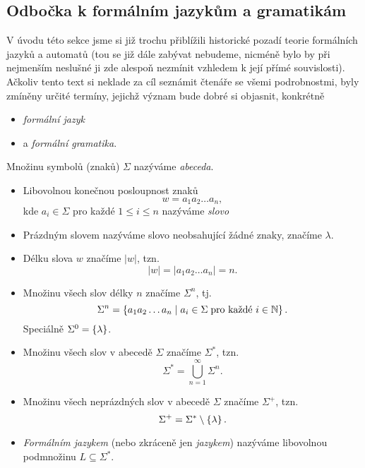 \subsection{Odbočka k formálním jazykům a gramatikám}\label{subsec:formalni-jazyky-a-gramatiky}

V úvodu této sekce jsme si již trochu přiblížili historické pozadí teorie formálních jazyků a automatů (tou se již dále zabývat nebudeme, nicméně bylo by při nejmenším neslušné ji zde alespoň nezmínit vzhledem k její přímé souvislosti). Ačkoliv tento text si neklade za cíl seznámit čtenáře se všemi podrobnostmi, byly zmíněny určité termíny, jejichž význam bude dobré si objasnit, konkrétně
\begin{itemize}
    \item \emph{formální jazyk}
    \item a \emph{formální gramatika}.
\end{itemize}
\begin{definition}\label{def:formalni-jazyk-etc}
    Množinu symbolů (znaků) $\Sigma$ nazýváme \emph{abeceda}.
    \begin{itemize}
        \item Libovolnou konečnou posloupnost znaků
        \[w=a_1a_2\ldots a_n,\]
        kde $a_i\in\Sigma$ pro každé $1\leqslant i\leqslant n$ nazýváme \emph{slovo}
        \item Prázdným slovem nazýváme slovo neobsahující žádné znaky, značíme $\lambda$.
        \item Délku slova $w$ značíme $|w|$, tzn.
        \[|w|=|a_1a_2\ldots a_n|=n.\]
        \item Množinu všech slov délky $n$ značíme $\Sigma^n$, tj.
        \[\Sigma^n=\left\{a_1a_2\ldots a_n\mid a_i\in\Sigma\;\text{pro každé $i\in\mathbb{N}$}\right\}.\]
        Speciálně $\Sigma^0=\left\{\lambda\right\}$.
        \item Množinu všech slov v abecedě $\Sigma$ značíme $\Sigma^*$, tzn.
        \[\Sigma^*=\bigcup_{n=1}^\infty\Sigma^n.\]
        \item Množinu všech neprázdných slov v abecedě $\Sigma$ značíme $\Sigma^+$, tzn.
        \[\Sigma^+=\Sigma^*\setminus\left\{\lambda\right\}.\]
        \item \emph{Formálním jazykem} (nebo zkráceně jen \emph{jazykem}) nazýváme libovolnou podmnožinu $L\subseteq\Sigma^*$.
    \end{itemize}
\end{definition}

